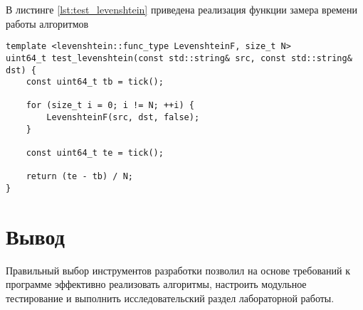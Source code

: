 В листинге \ref{lst:test_levenshtein} приведена реализация функции замера времени работы алгоритмов

\begin{lstlisting}[caption={Функция замера времени работы алгоритмов в тиках},label={lst:test_levenshtein},style={cpp}]
template <levenshtein::func_type LevenshteinF, size_t N>
uint64_t test_levenshtein(const std::string& src, const std::string& dst) {
	const uint64_t tb = tick();

	for (size_t i = 0; i != N; ++i) {
		LevenshteinF(src, dst, false);
	}

	const uint64_t te = tick();

	return (te - tb) / N;
}
\end{lstlisting}


\section*{Вывод}

Правильный выбор инструментов разработки позволил на основе требований к программе эффективно реализовать алгоритмы, настроить модульное тестирование и выполнить исследовательский раздел лабораторной работы.
